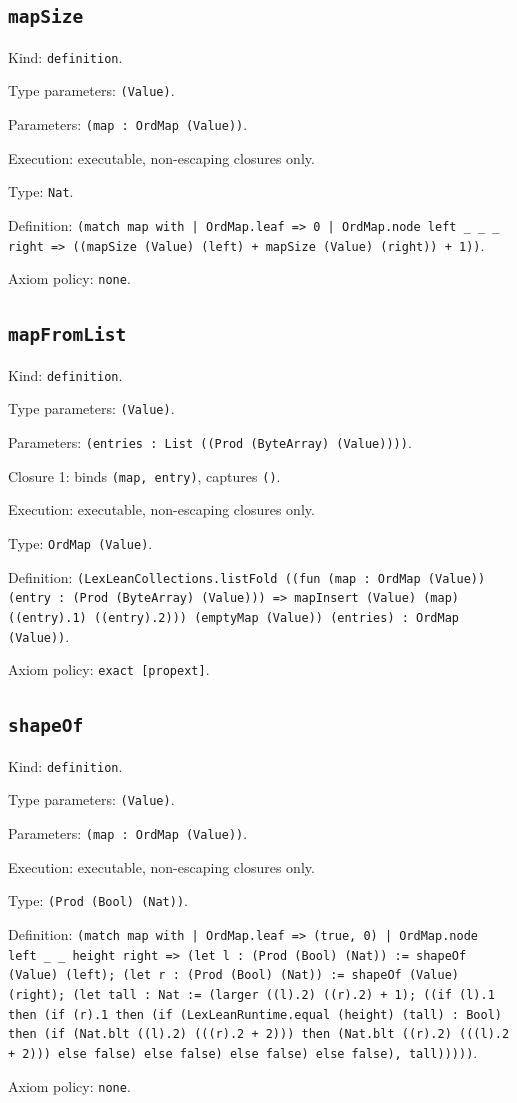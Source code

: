 \documentclass[11pt]{article}
\begin{document}
\subsection*{\texttt{mapSize}}
\noindent Kind: \texttt{definition}.\par
\noindent Type parameters: \texttt{(Value)}.\par
\noindent Parameters: \texttt{(map : OrdMap (Value))}.\par
\noindent Execution: executable, non-escaping closures only.\par
\noindent Type: \texttt{Nat}.\par
\noindent Definition: \texttt{(match map with | OrdMap.leaf => 0 | OrdMap.node left \_ \_ \_ right => ((mapSize (Value) (left) + mapSize (Value) (right)) + 1))}.\par
\noindent Axiom policy: \texttt{none}.\par
\subsection*{\texttt{mapFromList}}
\noindent Kind: \texttt{definition}.\par
\noindent Type parameters: \texttt{(Value)}.\par
\noindent Parameters: \texttt{(entries : List ((Prod (ByteArray) (Value))))}.\par
\noindent Closure 1: binds \texttt{(map, entry)}, captures \texttt{()}.\par
\noindent Execution: executable, non-escaping closures only.\par
\noindent Type: \texttt{OrdMap (Value)}.\par
\noindent Definition: \texttt{(LexLeanCollections.listFold ((fun (map : OrdMap (Value)) (entry : (Prod (ByteArray) (Value))) => mapInsert (Value) (map) ((entry).1) ((entry).2))) (emptyMap (Value)) (entries) : OrdMap (Value))}.\par
\noindent Axiom policy: \texttt{exact [propext]}.\par
\subsection*{\texttt{shapeOf}}
\noindent Kind: \texttt{definition}.\par
\noindent Type parameters: \texttt{(Value)}.\par
\noindent Parameters: \texttt{(map : OrdMap (Value))}.\par
\noindent Execution: executable, non-escaping closures only.\par
\noindent Type: \texttt{(Prod (Bool) (Nat))}.\par
\noindent Definition: \texttt{(match map with | OrdMap.leaf => (true, 0) | OrdMap.node left \_ \_ height right => (let l : (Prod (Bool) (Nat)) := shapeOf (Value) (left); (let r : (Prod (Bool) (Nat)) := shapeOf (Value) (right); (let tall : Nat := (larger ((l).2) ((r).2) + 1); ((if (l).1 then (if (r).1 then (if (LexLeanRuntime.equal (height) (tall) : Bool) then (if (Nat.blt ((l).2) (((r).2 + 2))) then (Nat.blt ((r).2) (((l).2 + 2))) else false) else false) else false) else false), tall)))))}.\par
\noindent Axiom policy: \texttt{none}.\par
\end{document}
